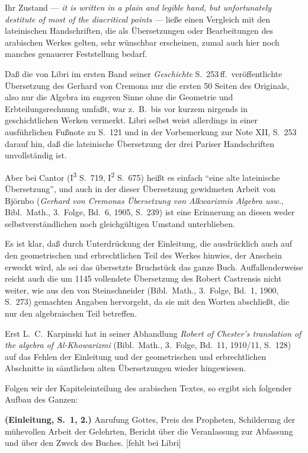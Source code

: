 \documentclass[11pt,a4paper]{article}
\newcommand{\enquote}[1]{``#1''}
\begin{document}
Ihr Zustand --- \textit{it is written in a plain and legible hand, but unfortunately destitute of most of the diacritical points} --- lie\ss{}e einen Vergleich mit den lateinischen Handschriften, die als \"Ubersetzungen oder Bearbeitungen des arabischen Werkes gelten, sehr w\"unschbar erscheinen, zumal auch hier noch manches genauerer Feststellung bedarf.

Da\ss{} die von Libri im ersten Band seiner \textit{Geschichte} S.\ 253\,ff.\ ver\"offentlichte \"Ubersetzung des Gerhard von Cremona nur die ersten 50 Seiten des Originals, also nur die Algebra im engeren Sinne ohne die Geometrie und Erbteilungsrechnung umfa\ss{}t, war z.\ B.\ bis vor kurzem nirgends in geschichtlichen Werken vermerkt. Libri selbst weist allerdings in einer ausf\"uhrlichen Fu\ss{}note zu S.\ 121 und in der Vorbemerkung zur Note XII, S.\ 253 darauf hin, da\ss{} die lateinische \"Ubersetzung der drei Pariser Handschriften unvollst\"andig ist.

Aber bei Cantor (I\textsuperscript{3} S.\ 719, I\textsuperscript{2} S.\ 675) hei\ss{}t es einfach \enquote{eine alte lateinische \"Ubersetzung}, und auch in der dieser \"Ubersetzung gewidmeten Arbeit von Bj\"ornbo (\textit{Gerhard von Cremonas \"Ubersetzung von Alkwarizmis Algebra usw.}, Bibl.\ Math., 3.\ Folge, Bd.\ 6, 1905, S.\ 239) ist eine Erinnerung an diesen weder selbstverst\"andlichen noch gleichg\"ultigen Umstand unterblieben.

Es ist klar, da\ss{} durch Unterdr\"uckung der Einleitung, die ausdr\"ucklich auch auf den geometrischen und erbrechtlichen Teil des Werkes hinwies, der Anschein erweckt wird, als sei das \"ubersetzte Bruchst\"uck das ganze Buch. Auffallenderweise reicht auch die um 1145 vollendete \"Ubersetzung des Robert Castrensis nicht weiter, wie aus den von Steinschneider (Bibl.\ Math., 3.\ Folge, Bd.\ 1, 1900, S.\ 273) gemachten Angaben hervorgeht, da sie mit den Worten abschlie\ss{}t, die nur den algebraischen Teil betreffen.

Erst L.\ C.\ Karpinski hat in seiner Abhandlung \textit{Robert of Chester's translation of the algebra of Al-Khowarizmi} (Bibl.\ Math., 3.\ Folge, Bd.\ 11, 1910/11, S.\ 128) auf das Fehlen der Einleitung und der geometrischen und erbrechtlichen Abschnitte in s\"amtlichen alten \"Ubersetzungen wieder hingewiesen.

Folgen wir der Kapiteleinteilung des arabischen Textes, so ergibt sich folgender Aufbau des Ganzen:

\textbf{(Einleitung, S.\ 1, 2.)} Anrufung Gottes, Preis des Propheten, Schilderung der m\"uhevollen Arbeit der Gelehrten, Bericht \"uber die Veranlassung zur Abfassung und \"uber den Zweck des Buches. [fehlt bei Libri]
\end{document}
